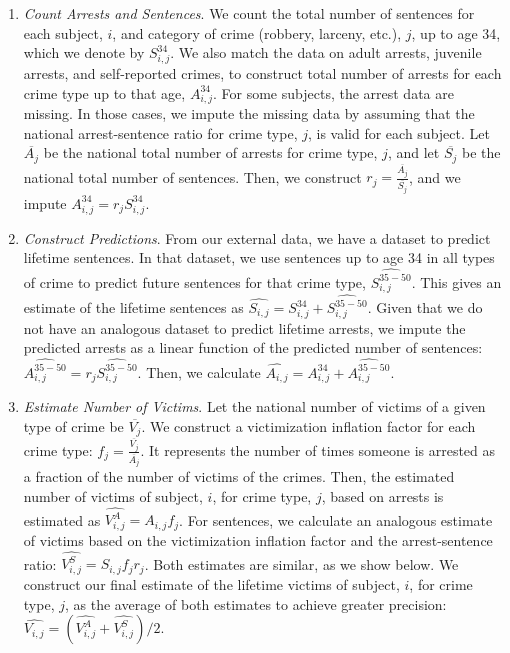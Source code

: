 \begin{enumerate}
\item \textit{Count Arrests and Sentences}. We count the total number of sentences for each subject, $i$, and category of crime (robbery, larceny, etc.), $j$, up to age 34,  which we denote by $S_{i,j}^{34}$. We also match the data on adult arrests, juvenile arrests, and self-reported crimes, to construct total number of  arrests for each crime type up to that age, $A_{i,j}^{34}$. For some subjects, the arrest data are missing. In those cases, we impute the missing data by assuming that the national arrest-sentence ratio for crime type, $j$, is valid for each subject. Let $\overline{A_j}$ be the national total number of arrests for crime type, $j$, and let $\overline{S_j}$ be the national total number of sentences. Then, we construct $r_j=\frac{\overline{A_j}}{\overline{S_j}}$, and we impute $A_{i,j}^{34}=r_j S_{i,j}^{34}$.

\item \textit{Construct Predictions}. From our external data, we have a dataset to predict lifetime sentences. In that dataset, we use sentences up to age 34 in all types of crime to predict future sentences for that crime type, $\widehat{S_{i,j}^{35-50}}$. This gives an estimate of the lifetime sentences as $\widehat{S_{i,j}}=S_{i,j}^{34}+\widehat{S_{i,j}^{35-50}}$. Given that we do not have an analogous dataset to predict lifetime arrests, we impute the predicted arrests as a linear function of the predicted number of sentences: $\widehat{A_{i,j}^{35-50}}=r_j \widehat{S_{i,j}^{35-50}}$. Then, we calculate $\widehat{A_{i,j}}=A_{i,j}^{34}+\widehat{A_{i,j}^{35-50}}$.

\item \textit{Estimate Number of Victims}. Let the national number of victims of a given type of crime be $\overline{V_j}$. We construct a victimization inflation factor for each crime type: $f_j=\frac{\overline{V_j}}{\overline{A_j}}$. It represents the number of times someone is arrested as a fraction of the number of victims of the crimes. Then, the estimated number of victims of subject, $i$, for crime type, $j$, based on arrests is estimated as $\widehat{V_{i,j}^{A}}=A_{i,j}f_j$. For sentences, we calculate an analogous estimate of victims based on the victimization inflation factor and the arrest-sentence ratio: $\widehat{V_{i,j}^{S}}=S_{i,j}f_j r_j$. Both estimates are similar, as we show below. We construct our final estimate of the lifetime victims of subject, $i$, for crime type, $j$, as the average of both estimates to achieve greater precision: $\widehat{V_{i,j}}=\left(\widehat{V_{i,j}^A}+\widehat{V_{i,j}^S}\right)/2$.


\end{enumerate}
